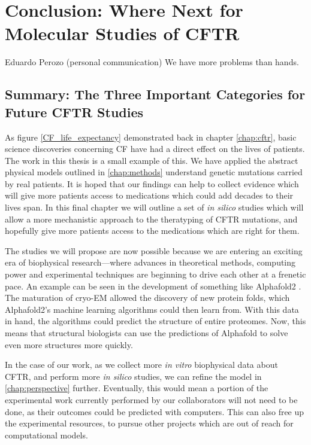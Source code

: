 \chapter{Conclusion: Where Next for Molecular Studies of CFTR}
\label{chap:conclusion}
\begin{chapquote} {Eduardo Perozo (personal communication)}
We have more problems than hands. 
\end{chapquote}


\section{Summary: The Three Important Categories for Future CFTR Studies}

As figure \ref{CF_life_expectancy} demonstrated back in chapter \ref{chap:cftr}, basic science discoveries concerning CF have had a direct effect on the lives of patients. The work in this thesis is a small example of this. We have applied the abstract physical models outlined in \ref{chap:methods} understand genetic mutations carried by real patients. It is hoped that our findings can help to collect evidence which will give more patients access to medications which could add decades to their lives span. In this final chapter we will outline a set of \textit{in silico} studies which will allow a more mechanistic approach to the theratyping of CFTR mutations, and hopefully give more patients access to the medications which are right for them.  

The studies we will propose are now possible because we are entering an exciting era of biophysical research---where advances in theoretical methods, computing power and experimental techniques are beginning to drive each other at a frenetic pace. An example can be seen in the development of something like Alphafold2 \cite{jumper2021}. The maturation of cryo-EM allowed the discovery of new protein folds, which Alphafold2's machine learning algorithms could then learn from. With this data in hand, the algorithms could predict the structure of entire proteomes. Now, this means that structural biologists can use the predictions of Alphafold to solve even more structures more quickly. 

In the case of our work, as we collect more \textit{in vitro} biophysical data about CFTR, and perform more \textit{in silico} studies, we can refine the model in \ref{chap:perspective} further. Eventually, this would mean a portion of the experimental work currently performed by our collaborators will not need to be done, as their outcomes could be predicted with computers. This can also free up the experimental resources, to pursue other projects which are out of reach for computational models. 

